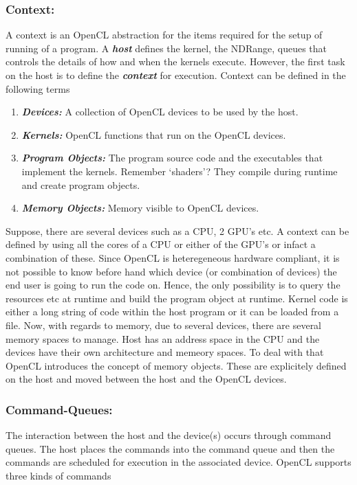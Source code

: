 \documentclass[10pt]{article}
\begin{document}
\subsubsection{Context:}
A context is an OpenCL abstraction for the items required for the setup of running of a program. A \textit{\textbf{host}} defines the kernel, the NDRange, queues that controls the details of how and when the kernels execute. However, the first task on the host is to define the \textit{\textbf{context}} for execution. Context can be defined in the following terms
\begin{enumerate}
	\item \textit{\textbf{Devices:}} A collection of OpenCL devices to be used by the host.
	\item \textit{\textbf{Kernels:}} OpenCL functions that run on the OpenCL devices.
	\item \textit{\textbf{Program Objects:}} The program source code and the executables that implement the kernels. Remember `shaders'? They compile during runtime and create program objects.
	\item \textit{\textbf{Memory Objects:}} Memory visible to OpenCL devices.
\end{enumerate}

Suppose, there are several devices such as a CPU, 2 GPU's etc. A context can be defined by using all the cores of a CPU or either of the GPU's or infact a combination of these. Since OpenCL is heteregeneous hardware compliant, it is not possible to know before hand which device (or combination of devices) the end user is going to run the code on. Hence, the only possibility is to query the resources etc at runtime and build the program object at runtime. Kernel code is either a long string of code within the host program or it can be loaded from a file. Now, with regards to memory, due to several devices, there are several memory spaces to manage. Host has an address space in the CPU and the devices have their own architecture and memeory spaces. To deal with that OpenCL introduces the concept of memory objects. These are explicitely defined on the host and moved between the host and the OpenCL devices.

\vspace{1cm}
{\color{red} \date{13-Nov-2020}}
\subsubsection{Command-Queues:}
The interaction between the host and the device(s) occurs through command queues. The host places the commands into the command queue and then the commands are scheduled for execution in the associated device. OpenCL supports three kinds of commands
\end{document}
